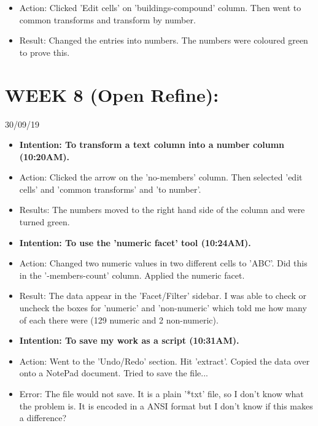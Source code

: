\documentclass[a4paper,12pt]{article}
\begin{document}
\begin{itemize}
\begin{itemize}
\item Action: Clicked 'Edit cells' on 'buildings-compound' column. Then went to common transforms and transform by number.


\item Result: Changed the entries into numbers. The numbers were coloured green to prove this. 


\end{itemize}

\section{WEEK 8 (Open Refine):}

30/09/19

\begin {itemize}

\item \textbf{Intention: To transform a text column into a number column (10:20AM).}

\item Action: Clicked the arrow on the 'no-members' column. Then selected 'edit cells' and 'common transforms' and 'to number'. 

\item Results: The numbers moved to the right hand side of the column and were turned green. 

\item \textbf {Intention: To use the 'numeric facet' tool (10:24AM).}

\item Action: Changed two numeric values in two different cells to 'ABC'. Did this in the '-members-count' column. Applied the numeric facet.

\item Result: The data appear in the 'Facet/Filter' sidebar. I was able to check or uncheck the boxes for 'numeric' and 'non-numeric' which told me how many of each there were (129 numeric and 2 non-numeric). 

\item \textbf {Intention: To save my work as a script (10:31AM).}

\item Action: Went to the 'Undo/Redo' section. Hit 'extract'. Copied the data over onto a NotePad document. Tried to save the file...

\item Error: The file would not save. It is a plain '*txt' file, so I don't know what the problem is. It is encoded in a ANSI format but I don't know if this makes a difference?


\end{itemize}
\end{itemize}
\end{document}
